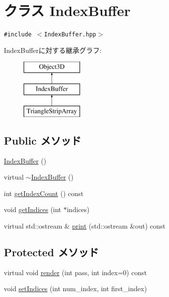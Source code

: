 \hypertarget{classm3g_1_1IndexBuffer}{
\section{クラス IndexBuffer}
\label{classm3g_1_1IndexBuffer}
}
{\tt \#include $<$IndexBuffer.hpp$>$}

IndexBufferに対する継承グラフ:\begin{figure}[H]
\begin{center}
\leavevmode
\includegraphics[height=3cm]{classm3g_1_1IndexBuffer}
\end{center}
\end{figure}
\subsection*{Public メソッド}
\begin{CompactItemize}
\item 
\hyperlink{classm3g_1_1IndexBuffer_d2e68a2d7c6c753d3abfeef42ee79427}{IndexBuffer} ()
\item 
virtual \hyperlink{classm3g_1_1IndexBuffer_ac7952364fe4d2d7b2731da5380c841c}{$\sim$IndexBuffer} ()
\item 
int \hyperlink{classm3g_1_1IndexBuffer_fe9ae2993ebcdb93d5ff26d57c81b73e}{getIndexCount} () const 
\item 
void \hyperlink{classm3g_1_1IndexBuffer_650953afac45099025a524ab160b911f}{getIndices} (int $\ast$indices)
\item 
virtual std::ostream \& \hyperlink{classm3g_1_1IndexBuffer_6fea17fa1532df3794f8cb39cb4f911f}{print} (std::ostream \&out) const 
\end{CompactItemize}
\subsection*{Protected メソッド}
\begin{CompactItemize}
\item 
virtual void \hyperlink{classm3g_1_1IndexBuffer_1efcb1973989d9963d5bd6d03065d389}{render} (int pass, int index=0) const 
\item 
void \hyperlink{classm3g_1_1IndexBuffer_26c5b78691f0f92bd8589714cc25b6a8}{setIndices} (int num\_\-index, int first\_\-index)
\end{CompactItemize}
